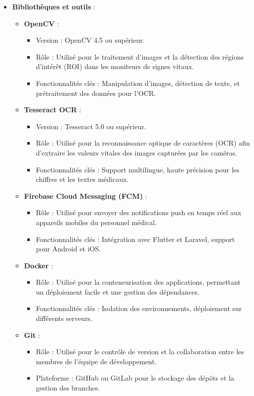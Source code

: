 \begin{itemize}
    \item \textbf{Bibliothèques et outils} :
    \begin{itemize}
        \item \textbf{OpenCV} :
            \begin{itemize}
                \item Version : OpenCV 4.5 ou supérieur.
                \item Rôle : Utilisé pour le traitement d'images et la détection des régions d'intérêt (ROI) dans les moniteurs de signes vitaux.
                \item Fonctionnalités clés : Manipulation d'images, détection de texte, et prétraitement des données pour l'OCR.
            \end{itemize}
        \item \textbf{Tesseract OCR} :
            \begin{itemize}
                \item Version : Tesseract 5.0 ou supérieur.
                \item Rôle : Utilisé pour la reconnaissance optique de caractères (OCR) afin d'extraire les valeurs vitales des images capturées par les caméras.
                \item Fonctionnalités clés : Support multilingue, haute précision pour les chiffres et les textes médicaux.
            \end{itemize}
        \item \textbf{Firebase Cloud Messaging (FCM)} :
            \begin{itemize}
                \item Rôle : Utilisé pour envoyer des notifications push en temps réel aux appareils mobiles du personnel médical.
                \item Fonctionnalités clés : Intégration avec Flutter et Laravel, support pour Android et iOS.
            \end{itemize}
        \item \textbf{Docker} :
            \begin{itemize}
                \item Rôle : Utilisé pour la conteneurisation des applications, permettant un déploiement facile et une gestion des dépendances.
                \item Fonctionnalités clés : Isolation des environnements, déploiement sur différents serveurs.
            \end{itemize}
        \item \textbf{Git} :
            \begin{itemize}
                \item Rôle : Utilisé pour le contrôle de version et la collaboration entre les membres de l'équipe de développement.
                \item Plateforme : GitHub ou GitLab pour le stockage des dépôts et la gestion des branches.
            \end{itemize}
    \end{itemize}
\end{itemize}
